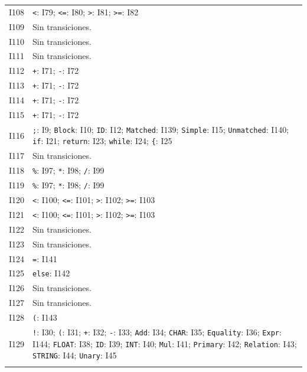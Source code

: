 {\begin{longtable}{@{}r p{14.7cm}@{}}
I108 & \texttt{\textless{}}: I79; \texttt{\textless{}=}: I80; \texttt{\textgreater{}}: I81; \texttt{\textgreater{}=}: I82\\\addlinespace[3pt]
I109 & Sin transiciones.\\\addlinespace[3pt]
I110 & Sin transiciones.\\\addlinespace[3pt]
I111 & Sin transiciones.\\\addlinespace[3pt]
I112 & \texttt{+}: I71; \texttt{-}: I72\\\addlinespace[3pt]
I113 & \texttt{+}: I71; \texttt{-}: I72\\\addlinespace[3pt]
I114 & \texttt{+}: I71; \texttt{-}: I72\\\addlinespace[3pt]
I115 & \texttt{+}: I71; \texttt{-}: I72\\\addlinespace[3pt]
I116 & \texttt{;}: I9; \texttt{Block}: I10; \texttt{ID}: I12; \texttt{Matched}: I139; \texttt{Simple}: I15; \texttt{Unmatched}: I140; \texttt{if}: I21; \texttt{return}: I23; \texttt{while}: I24; \texttt{\{}: I25\\\addlinespace[3pt]
I117 & Sin transiciones.\\\addlinespace[3pt]
I118 & \texttt{\%}: I97; \texttt{*}: I98; \texttt{/}: I99\\\addlinespace[3pt]
I119 & \texttt{\%}: I97; \texttt{*}: I98; \texttt{/}: I99\\\addlinespace[3pt]
I120 & \texttt{\textless{}}: I100; \texttt{\textless{}=}: I101; \texttt{\textgreater{}}: I102; \texttt{\textgreater{}=}: I103\\\addlinespace[3pt]
I121 & \texttt{\textless{}}: I100; \texttt{\textless{}=}: I101; \texttt{\textgreater{}}: I102; \texttt{\textgreater{}=}: I103\\\addlinespace[3pt]
I122 & Sin transiciones.\\\addlinespace[3pt]
I123 & Sin transiciones.\\\addlinespace[3pt]
I124 & \texttt{=}: I141\\\addlinespace[3pt]
I125 & \texttt{else}: I142\\\addlinespace[3pt]
I126 & Sin transiciones.\\\addlinespace[3pt]
I127 & Sin transiciones.\\\addlinespace[3pt]
I128 & \texttt{(}: I143\\\addlinespace[3pt]
I129 & \texttt{!}: I30; \texttt{(}: I31; \texttt{+}: I32; \texttt{-}: I33; \texttt{Add}: I34; \texttt{CHAR}: I35; \texttt{Equality}: I36; \texttt{Expr}: I144; \texttt{FLOAT}: I38; \texttt{ID}: I39; \texttt{INT}: I40; \texttt{Mul}: I41; \texttt{Primary}: I42; \texttt{Relation}: I43; \texttt{STRING}: I44; \texttt{Unary}: I45\\\addlinespace[3pt]

\end{longtable}}
